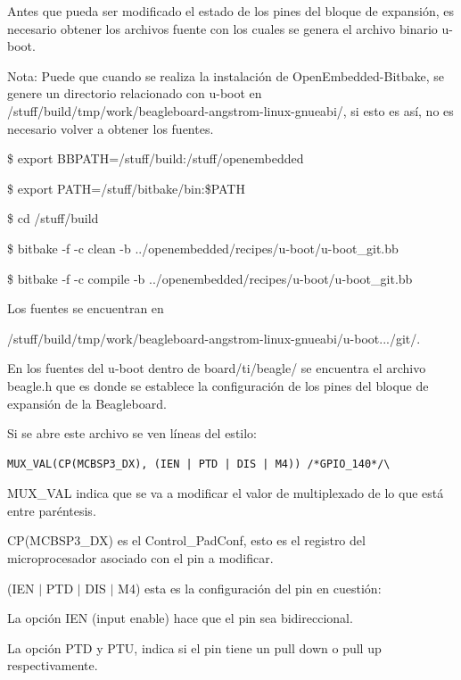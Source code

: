 \bigskip
Antes que pueda ser modificado el estado de los pines del bloque de expansión,
es necesario obtener los archivos fuente con los cuales se genera el archivo binario u-boot.

\bigskip
Nota: Puede que cuando se realiza la instalación de OpenEmbedded-Bitbake, se genere un directorio relacionado con u-boot en /stuff/build/tmp/work/beagleboard-angstrom-linux-gnueabi/, si esto es así, no es necesario volver a obtener los fuentes.

\bigskip
{}

\bigskip
\centerline{\$ export BBPATH=/stuff/build:/stuff/openembedded}

\centerline{\$ export PATH=/stuff/bitbake/bin:\$PATH}

\bigskip
{}

\centerline{\$ cd /stuff/build}

\centerline{\$ bitbake -f -c clean -b ../openembedded/recipes/u-boot/u-boot\_git.bb}

\centerline{\$ bitbake -f -c compile -b ../openembedded/recipes/u-boot/u-boot\_git.bb}

\bigskip
Los fuentes se encuentran en 

/stuff/build/tmp/work/beagleboard-angstrom-linux-gnueabi/u-boot.../git/.

\bigskip
En los fuentes del u-boot dentro de board/ti/beagle/ se encuentra el archivo beagle.h que es donde se establece la configuración de los pines del bloque de expansión de la Beagleboard.

Si se abre este archivo se ven líneas del estilo: 

\begin{verbatim}
MUX_VAL(CP(MCBSP3_DX), (IEN | PTD | DIS | M4)) /*GPIO_140*/\
\end{verbatim}

MUX\_VAL indica que se va a modificar el valor de multiplexado de lo que está entre paréntesis. 

\bigskip
CP(MCBSP3\_DX) es el Control\_PadConf, esto es el registro del microprocesador asociado con el 
pin a modificar. 

\bigskip
(IEN $|$ PTD $|$ DIS $|$ M4) esta es la configuración del pin en cuestión: 


La opción IEN (input enable) hace que el pin sea bidireccional. 

La opción PTD y PTU, indica si el pin tiene un pull down o pull up respectivamente. 

